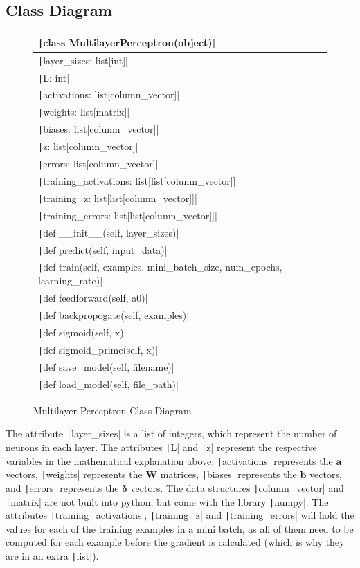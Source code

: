 \documentclass[12pt]{report}
\newcommand{\pil}[1]{\protect\texttt|#1|}
\begin{document}
\subsection{Class Diagram}
\begin{figure}[H]
\centering
\begin{tabular}{| m{15cm} |} 
    \hline
    \pil{class MultilayerPerceptron(object)} \\
    \hline
    \pil{layer_sizes: list[int]} \\
    \pil{L: int} \\
    \pil{activations: list[column_vector]} \\
    \pil{weights: list[matrix]} \\
    \pil{biases: list[column_vector]} \\
    \pil{z: list[column_vector]} \\
    \pil{errors: list[column_vector]} \\
    \pil{training_activations: list[list[column_vector]]} \\
    \pil{training_z: list[list[column_vector]]} \\
    \pil{training_errors: list[list[column_vector]]} \\
    \hline
    \pil{def __init__(self, layer_sizes)} \\
    \pil{def predict(self, input_data)} \\
    \pil{def train(self, examples, mini_batch_size, num_epochs, learning_rate)} \\
    \pil{def feedforward(self, a0)} \\
    \pil{def backpropogate(self, examples)} \\
    \pil{def sigmoid(self, x)} \\
    \pil{def sigmoid_prime(self, x)} \\
    \pil{def save_model(self, filename)} \\
    \pil{def load_model(self, file_path)} \\
    \hline
\end{tabular}
\caption{Multilayer Perceptron Class Diagram}\label{fig:classDiagram}
\end{figure}

The attribute \pil{layer_sizes} is a list of integers, which represent the number of neurons in each layer. The attributes \pil{L} and \pil{z} represent the respective variables in the mathematical explanation above, \pil{activations} represents the $\mathbf{a}$ vectors, \pil{weights} represents the $\mathbf{W}$ matrices, \pil{biases} represents the $\mathbf{b}$ vectors, and \pil{errors} represents the $\bm{\delta}$ vectors. The data structures \pil{column_vector} and \pil{matrix} are not built into python, but come with the library \pil{numpy}. The attributes \pil{training_activations}, \pil{training_z} and \pil{training_errors} will hold the values for each of the training examples in a mini batch, as all of them need to be computed for each example before the gradient is calculated (which is why they are in an extra \pil{list}).
\end{document}
